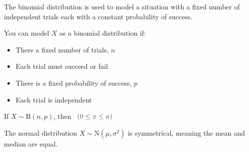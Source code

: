 \documentclass[../main.tex]{subfile}
\begin{document}


The binomial distribution is used to model a situation with a fixed number of independent trials each with a constant probability of success.

You can model $X$ as a binomial distribution if:
\begin{itemize}
	\item There a fixed number of trials, $n$
	\item Each trial must succeed or fail
	\item There is a fixed probability of success, $p$
	\item Each trial is independent
\end{itemize}

\begin{center}
	If $X \sim \text{B}(n, p)$, then 
	\ $\constraint{0 \leq x \leq n}$
\end{center}


The normal distribution $X \sim \text{N}(\mu, \sigma^2)$ is symmetrical, meaning the mean and median are equal.
\end{document}
